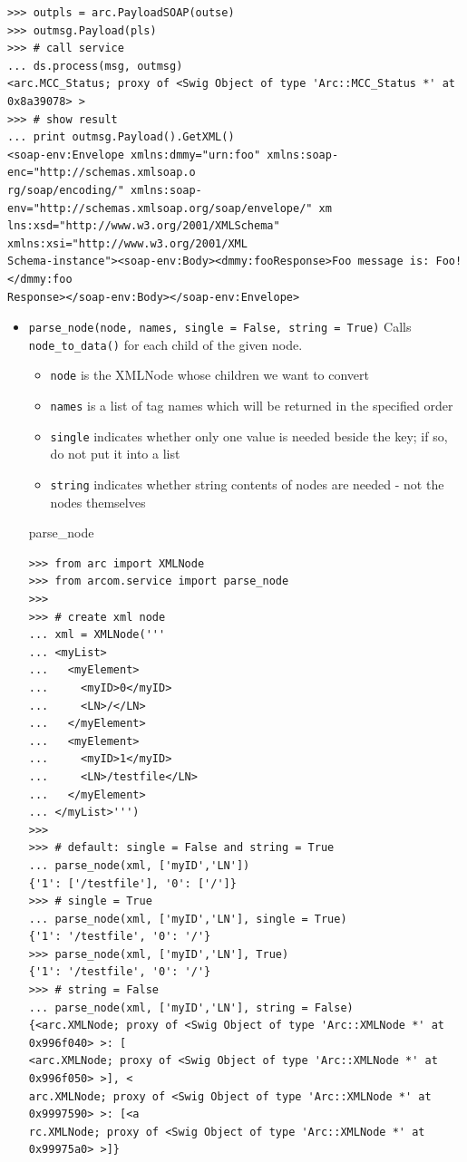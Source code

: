 \documentclass{article}
\begin{document}
\begin{flushleft}
\begin{itemize}
{\begin{example}
\begin{verbatim}
>>> outpls = arc.PayloadSOAP(outse)
>>> outmsg.Payload(pls)
>>> # call service
... ds.process(msg, outmsg)
<arc.MCC_Status; proxy of <Swig Object of type 'Arc::MCC_Status *' at 0x8a39078> >
>>> # show result
... print outmsg.Payload().GetXML()
<soap-env:Envelope xmlns:dmmy="urn:foo" xmlns:soap-enc="http://schemas.xmlsoap.o
rg/soap/encoding/" xmlns:soap-env="http://schemas.xmlsoap.org/soap/envelope/" xm
lns:xsd="http://www.w3.org/2001/XMLSchema" xmlns:xsi="http://www.w3.org/2001/XML
Schema-instance"><soap-env:Body><dmmy:fooResponse>Foo message is: Foo!</dmmy:foo
Response></soap-env:Body></soap-env:Envelope>
\end{verbatim}
    \end{example}
  }
\end{itemize}

\begin{itemize}
  \item{ \verb$parse_node(node, names, single = False, string = True)$ \linebreak
  Calls \verb$node_to_data()$ for each child of the given node.
  \begin{itemize}
    \item{\verb$node$ is the XMLNode whose children we want to convert}
    \item{\verb$names$ is a list of tag names which will be returned in the specified order}
    \item{\verb$single$ indicates whether only one value is needed beside the key; if so, do not put it into a list}
    \item{\verb$string$ indicates whether string contents of nodes are needed - not the nodes themselves}
  \end{itemize}
    \begin{example}
      \caption{parse\_node}\label{pnex}
\begin{verbatim}
>>> from arc import XMLNode
>>> from arcom.service import parse_node
>>> 
>>> # create xml node
... xml = XMLNode('''
... <myList>
...   <myElement>
...     <myID>0</myID>
...     <LN>/</LN>
...   </myElement>
...   <myElement>
...     <myID>1</myID>
...     <LN>/testfile</LN>
...   </myElement>
... </myList>''')
>>> 
>>> # default: single = False and string = True
... parse_node(xml, ['myID','LN'])
{'1': ['/testfile'], '0': ['/']}
>>> # single = True
... parse_node(xml, ['myID','LN'], single = True)
{'1': '/testfile', '0': '/'}
>>> parse_node(xml, ['myID','LN'], True)
{'1': '/testfile', '0': '/'}
>>> # string = False
... parse_node(xml, ['myID','LN'], string = False)
{<arc.XMLNode; proxy of <Swig Object of type 'Arc::XMLNode *' at 0x996f040> >: [
<arc.XMLNode; proxy of <Swig Object of type 'Arc::XMLNode *' at 0x996f050> >], <
arc.XMLNode; proxy of <Swig Object of type 'Arc::XMLNode *' at 0x9997590> >: [<a
rc.XMLNode; proxy of <Swig Object of type 'Arc::XMLNode *' at 0x99975a0> >]}
\end{verbatim}
    \end{example}
  }
\end{itemize}


\end{flushleft}
\end{document}
